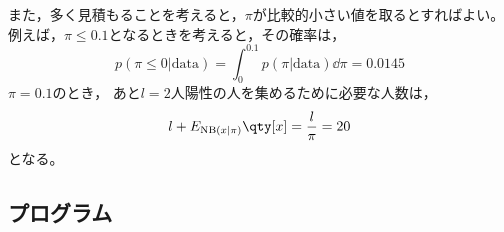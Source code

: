 \documentclass[dvipdfmx, fleqn]{jsarticle}
\begin{document}
また，多く見積もることを考えると，\(\pi\)が比較的小さい値を取るとすればよい。
例えば，\(\pi \le 0.1\)となるときを考えると，その確率は，
\begin{equation}
    p(\pi \le 0 | \mathrm{data}) = \int_0^{0.1} p(\pi | \mathrm{data}) \dd\pi = 0.0145
\end{equation}
\(\pi = 0.1\)のとき，
あと\(l = 2\)人陽性の人を集めるために必要な人数は，
\begin{equation}
    l + E_{\mathrm{NB}(x|\pi)} \qty[x] = \frac{l}{\pi} = 20
\end{equation}
となる。



\subsection*{プログラム}

\end{document}
